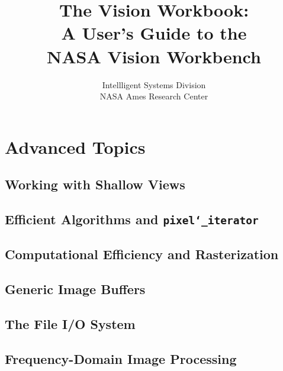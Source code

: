 \documentclass[letterpaper,12pt]{book}
\title{{\Huge The Vision Workbook:}\\A User's Guide to the\\NASA Vision Workbench}
\author{%
Intellligent Systems Division\\
NASA Ames Research Center}
\begin{document}
\maketitle








\chapter{Advanced Topics}\label{ch:advanced-topics}

\section{Working with Shallow Views}\label{sec:advanced.shallow}

\section{Efficient Algorithms and {\tt pixel\char`\_iterator}}

\section{Computational Efficiency and Rasterization}

\section{Generic Image Buffers}\label{sec:advanced.generic}

\section{The File I/O System}\label{sec:advanced.fileio}

\section{Frequency-Domain Image Processing}\label{sec:advanced.frequency}
\end{document}
